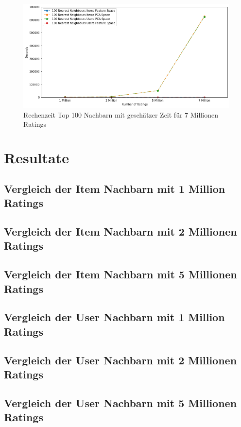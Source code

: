 \begin{figure}[h!tb]
	\centering
	\includegraphics[keepaspectratio,width=\linewidth]{img/Time to Compute all estimated.png} 
	\caption{Rechenzeit Top 100 Nachbarn mit geschätzer Zeit für 7 Millionen Ratings}
	\label{fig:Rechenzeit Total Estimated}
\end{figure}

\section{Resultate}
\subsection{Vergleich der Item Nachbarn mit 1 Million Ratings}
\subsection{Vergleich der Item Nachbarn mit 2 Millionen Ratings}
\subsection{Vergleich der Item Nachbarn mit 5 Millionen Ratings}

\subsection{Vergleich der User Nachbarn mit 1 Million Ratings}
\subsection{Vergleich der User Nachbarn mit 2 Millionen Ratings}
\subsection{Vergleich der User Nachbarn mit 5 Millionen Ratings}


